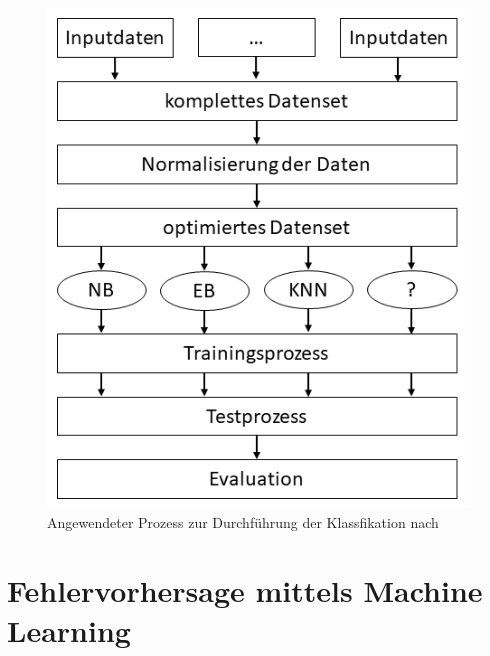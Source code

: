 \begin{figure}[H]
    \centering
    \includegraphics[width=\textwidth]{images/Prozess}
    \caption{Angewendeter Prozess zur Durchführung der Klassfikation nach \cite{Ceylan2006}}\label{fig:process}
\end{figure}

\section{Fehlervorhersage mittels Machine Learning}

\cleardoublepage
